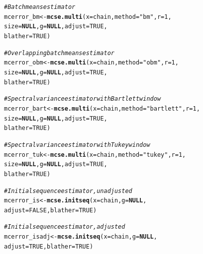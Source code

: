 \documentclass[11pt]{article}\usepackage[]{graphicx}\usepackage[]{color}
\makeatletter
\newcommand{\hlnum}[1]{\textcolor[rgb]{0.686,0.059,0.569}{#1}}%
\newcommand{\hlstr}[1]{\textcolor[rgb]{0.192,0.494,0.8}{#1}}%
\newcommand{\hlcom}[1]{\textcolor[rgb]{0.678,0.584,0.686}{\textit{#1}}}%
\newcommand{\hlstd}[1]{\textcolor[rgb]{0.345,0.345,0.345}{#1}}%
\newcommand{\hlkwa}[1]{\textcolor[rgb]{0.161,0.373,0.58}{\textbf{#1}}}%
\newcommand{\hlkwb}[1]{\textcolor[rgb]{0.69,0.353,0.396}{#1}}%
\newcommand{\hlkwc}[1]{\textcolor[rgb]{0.333,0.667,0.333}{#1}}%
\newcommand{\hlkwd}[1]{\textcolor[rgb]{0.737,0.353,0.396}{\textbf{#1}}}%
\newenvironment{kframe}{%
 \def\at@end@of@kframe{}%
 \ifinner\ifhmode%
  \def\at@end@of@kframe{\end{minipage}}%
  \begin{minipage}{\columnwidth}%
 \fi\fi%
 \def\FrameCommand##1{\hskip\@totalleftmargin \hskip-\fboxsep
 \colorbox{shadecolor}{##1}\hskip-\fboxsep
     \hskip-\linewidth \hskip-\@totalleftmargin \hskip\columnwidth}%
 \MakeFramed {\advance\hsize-\width
   \@totalleftmargin\z@ \linewidth\hsize
   \@setminipage}}%
 {\par\unskip\endMakeFramed%
 \at@end@of@kframe}
\newenvironment{knitrout}{}{} %
\makeatother
\begin{document}
\begin{knitrout}
\color{fgcolor}\begin{kframe}
\begin{alltt}
\hlcom{# Batch means estimator}
\hlstd{mcerror_bm} \hlkwb{<-} \hlkwd{mcse.multi}\hlstd{(}\hlkwc{x} \hlstd{= chain,} \hlkwc{method} \hlstd{=}  \hlstr{"bm"}\hlstd{,} \hlkwc{r} \hlstd{=} \hlnum{1}\hlstd{,}
                         \hlkwc{size} \hlstd{=} \hlkwa{NULL}\hlstd{,} \hlkwc{g} \hlstd{=} \hlkwa{NULL}\hlstd{,} \hlkwc{adjust} \hlstd{=} \hlnum{TRUE}\hlstd{,}
                         \hlkwc{blather} \hlstd{=} \hlnum{TRUE}\hlstd{)}

\hlcom{# Overlapping batch means estimator}
\hlstd{mcerror_obm} \hlkwb{<-} \hlkwd{mcse.multi}\hlstd{(}\hlkwc{x} \hlstd{= chain,} \hlkwc{method} \hlstd{=}  \hlstr{"obm"}\hlstd{,} \hlkwc{r} \hlstd{=} \hlnum{1}\hlstd{,}
                         \hlkwc{size} \hlstd{=} \hlkwa{NULL}\hlstd{,} \hlkwc{g} \hlstd{=} \hlkwa{NULL}\hlstd{,} \hlkwc{adjust} \hlstd{=} \hlnum{TRUE}\hlstd{,}
                         \hlkwc{blather} \hlstd{=} \hlnum{TRUE}\hlstd{)}

\hlcom{# Spectral variance estimator with Bartlett window}
\hlstd{mcerror_bart} \hlkwb{<-} \hlkwd{mcse.multi}\hlstd{(}\hlkwc{x} \hlstd{= chain,} \hlkwc{method} \hlstd{=}  \hlstr{"bartlett"}\hlstd{,} \hlkwc{r} \hlstd{=} \hlnum{1}\hlstd{,}
                           \hlkwc{size} \hlstd{=} \hlkwa{NULL}\hlstd{,} \hlkwc{g} \hlstd{=} \hlkwa{NULL}\hlstd{,} \hlkwc{adjust} \hlstd{=} \hlnum{TRUE}\hlstd{,}
                           \hlkwc{blather} \hlstd{=} \hlnum{TRUE}\hlstd{)}

\hlcom{# Spectral variance estimator with Tukey window}
\hlstd{mcerror_tuk} \hlkwb{<-} \hlkwd{mcse.multi}\hlstd{(}\hlkwc{x} \hlstd{= chain,} \hlkwc{method} \hlstd{=}  \hlstr{"tukey"}\hlstd{,} \hlkwc{r} \hlstd{=} \hlnum{1}\hlstd{,}
                          \hlkwc{size} \hlstd{=} \hlkwa{NULL}\hlstd{,} \hlkwc{g} \hlstd{=} \hlkwa{NULL}\hlstd{,} \hlkwc{adjust} \hlstd{=} \hlnum{TRUE}\hlstd{,}
                          \hlkwc{blather} \hlstd{=} \hlnum{TRUE}\hlstd{)}

\hlcom{# Initial sequence estimator, unadjusted}
\hlstd{mcerror_is} \hlkwb{<-} \hlkwd{mcse.initseq}\hlstd{(}\hlkwc{x} \hlstd{= chain,} \hlkwc{g} \hlstd{=} \hlkwa{NULL}\hlstd{,}
                           \hlkwc{adjust} \hlstd{=} \hlnum{FALSE}\hlstd{,} \hlkwc{blather} \hlstd{=} \hlnum{TRUE}\hlstd{)}

\hlcom{# Initial sequence estimator, adjusted}
\hlstd{mcerror_isadj} \hlkwb{<-} \hlkwd{mcse.initseq}\hlstd{(}\hlkwc{x} \hlstd{= chain,} \hlkwc{g} \hlstd{=} \hlkwa{NULL}\hlstd{,}
                              \hlkwc{adjust} \hlstd{=} \hlnum{TRUE}\hlstd{,} \hlkwc{blather} \hlstd{=} \hlnum{TRUE}\hlstd{)}
\end{alltt}
\end{kframe}
\end{knitrout}
\end{document}

